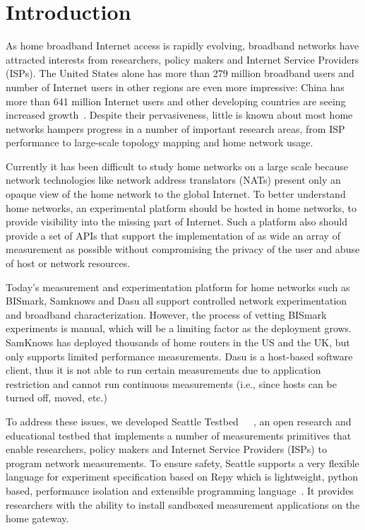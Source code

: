 \section{Introduction}
\label{sec.introduction}
As home broadband Internet access is rapidly evolving, broadband networks 
have attracted interests from researchers, policy makers and Internet 
Service Providers (ISPs). The United States alone has more than 279 million 
broadband users and number of Internet users in other regions are even more 
impressive: China has more than 641 million Internet users and other 
developing countries are seeing increased growth~\cite{asia}. Despite their 
pervasiveness, little is known about most home networks hampers progress in 
a number of important research areas, from ISP performance to large-scale 
topology mapping and home network usage.

Currently it has been difficult to study home networks on a large scale 
because network technologies like network address translators (NATs) present 
only an opaque view of the home network to the global Internet. To better 
understand home networks, an experimental platform should be hosted in home 
networks, to provide visibility into the missing part of Internet. Such a 
platform also should provide a set of APIs that support the implementation 
of as wide an array of measurement as possible without compromising the 
privacy of the user and abuse of host or network resources. 

Today's measurement and experimentation platform for home networks such as 
BISmark, Samknows and Dasu all support controlled network experimentation 
and broadband characterization. However, the process of vetting BISmark 
experiments is manual, which will be a limiting factor as the deployment 
grows. SamKnows has deployed thousands of home routers in the US and the UK, 
but only supports limited performance measurements. Dasu is a host-based 
software client, thus it is not able to run certain measurements due to 
application restriction and cannot run continuous measurements (i.e., since 
hosts can be turned off, moved, etc.)
 
To address these issues, we developed Seattle Testbed~\cite{seattle}~\cite{zhuang2013experience}~\cite{cappos2009seattle}, an open research and 
educational testbed that implements a number of measurements primitives that 
enable researchers, policy makers and Internet Service Providers (ISPs) to 
program network measurements. To ensure safety, Seattle supports a very 
flexible language for experiment specification based on Repy which is 
lightweight, python based, performance isolation and extensible programming 
language~\cite{cappos2010retaining}. It provides researchers with the 
ability to install sandboxed measurement applications on the home gateway. 


